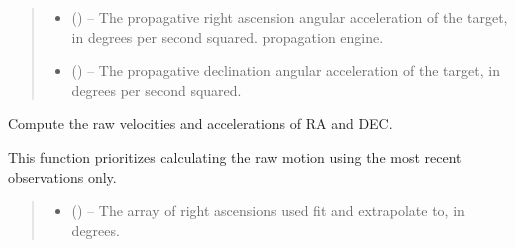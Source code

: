 \documentclass[letterpaper,11pt,english]{sphinxmanual}
\begin{document}
\begin{savenotes}
\begin{fulllineitems}
\begin{savenotes}
\begin{fulllineitems}
\begin{quote}
\begin{description}
\begin{itemize}
\item {} 
\sphinxAtStartPar
{} () – The propagative right ascension angular acceleration of the target, in
degrees per second squared.
propagation engine.

\item {} 
\sphinxAtStartPar
{} () – The propagative declination angular acceleration of the target, in
degrees per second squared.

\end{itemize}


\end{description}\end{quote}

\end{fulllineitems}\end{savenotes}


\begin{savenotes}\begin{fulllineitems}
\label{\detokenize{code/opihiexarata.propagate.solution:opihiexarata.propagate.solution.PropagativeSolution.__init_compute_raw_motion}}
\pysigstartsignatures
{}
\pysigstopsignatures
\sphinxAtStartPar
Compute the raw velocities and accelerations of RA and DEC.

\sphinxAtStartPar
This function prioritizes calculating the raw motion using the most
recent observations only.
\begin{quote}\begin{description}
\begin{itemize}
\item {} 
\sphinxAtStartPar
{} () – The array of right ascensions used fit and extrapolate to,
in degrees.


\end{itemize}
\end{description}
\end{quote}
\end{fulllineitems}
\end{savenotes}
\end{fulllineitems}
\end{savenotes}
\end{document}
